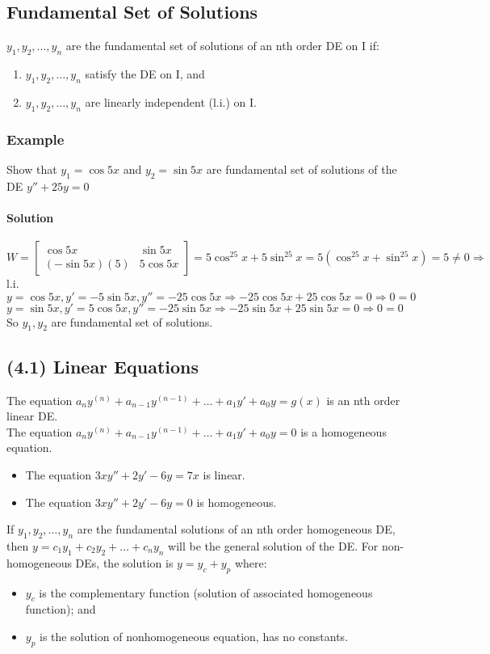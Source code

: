 \documentclass{article}
\begin{document}
\subsection{Fundamental Set of Solutions}
$y_1,y_2,\dots,y_n$ are the fundamental set of solutions of an nth order DE on I if: \begin{enumerate}
    \item $y_1,y_2,\dots,y_n$ satisfy the DE on I, and
    \item $y_1,y_2,\dots,y_n$ are linearly independent (l.i.) on I.
\end{enumerate}

\subsubsection{Example}
Show that $y_1=\cos5x$ and $y_2=\sin5x$ are fundamental set of solutions of the DE $y''+25y=0$
\paragraph{Solution} $W=\begin{bmatrix}
    \cos5x & \sin5x \\
    (-\sin5x)(5) & 5\cos5x
\end{bmatrix}=5\cos^25x+5\sin^25x=5(\cos^25x+\sin^25x)=5\neq0\Rightarrow$ l.i.
\\$y=\cos5x,y'=-5\sin5x,y''=-25\cos5x\Rightarrow -25\cos5x+25\cos5x=0\Rightarrow0=0$
\\$y=\sin5x,y'=5\cos5x,y''=-25\sin5x\Rightarrow -25\sin5x+25\sin5x=0\Rightarrow0=0$
\\So $y_1,y_2$ are fundamental set of solutions.

\subsection{(4.1) Linear Equations}
The equation $a_ny^{(n)}+a_{n-1}y^{(n-1)}+\dots+a_1y'+a_0y=g(x)$ is an nth order linear DE.
\\The equation $a_ny^{(n)}+a_{n-1}y^{(n-1)}+\dots+a_1y'+a_0y=0$ is a homogeneous equation.
\begin{itemize}
    \itemsep 0em
    \item The equation $3xy''+2y'-6y=7x$ is linear.
    \item The equation $3xy''+2y'-6y=0$ is homogeneous.
\end{itemize}
If $y_1,y_2,\dots,y_n$ are the fundamental solutions of an nth order homogeneous DE, then
$y=c_1y_1+c_2y_2+\dots+c_ny_n$ will be the general solution of the DE.
\newpage
For non-homogeneous DEs, the solution is $y=y_c+y_p$ where: \begin{itemize}
    \itemsep 0em
    \item $y_c$ is the complementary function (solution of associated homogeneous function); and
    \item $y_p$ is the solution of nonhomogeneous equation, has no constants.
\end{itemize}
\end{document}
